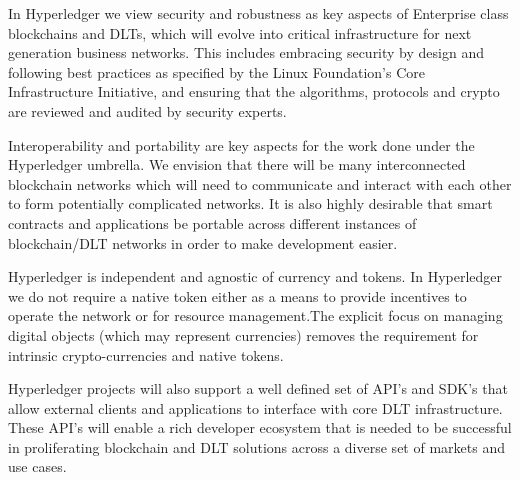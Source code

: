 In Hyperledger we view security and robustness as key aspects of Enterprise class blockchains and DLTs, which will evolve into critical infrastructure for next generation business networks. This includes embracing security by design and following best practices as specified by the Linux Foundation’s Core Infrastructure Initiative, and ensuring that the algorithms, protocols and crypto are reviewed and audited by security experts.

Interoperability and portability are key aspects for the work done under the Hyperledger umbrella. We envision that there will be many interconnected blockchain networks which will need to communicate and interact with each other to form potentially complicated networks. It is also highly desirable that smart contracts and applications be portable across different instances of blockchain/DLT networks in order to make development easier.

Hyperledger is independent and agnostic of currency and tokens. In Hyperledger we do not require a native token either as a means to provide incentives to operate the network or for resource management.The explicit focus on managing digital objects (which may represent currencies) removes the requirement for intrinsic crypto-currencies and native tokens. 

Hyperledger projects will also support a well defined set of API’s and SDK’s that allow external clients and applications to interface with core DLT infrastructure. These API’s will enable a rich developer ecosystem that is needed to be successful in proliferating blockchain and DLT solutions across a diverse set of markets and use cases.
